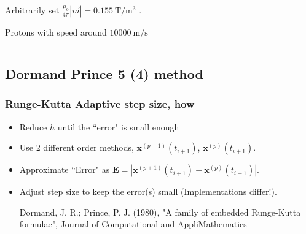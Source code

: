 \documentclass{beamer}
\begin{document}
\begin{frame}
\begin{columns}
\begin{column}{0.5\linewidth}
{{\color{gray}  Arbitrarily set $\frac{\mu_0}{4\pi}|\vec{m}|= \SI{0.155}{\tesla\per\cubic\meter}$ .

 Protons with speed around $\SI{10000}{\meter\per\second}$}


}%
\end{column}
\end{columns}
\end{frame}


\subsection{Dormand Prince 5 (4) method}

\begin{frame}
\frametitle{Runge-Kutta Adaptive step size, how}
\begin{itemize}
\item <1-> Reduce $h$ until the ``error" is small enough

\item <2-> Use 2 different order methods, $\mathbf{x}^{(p+1)}(t_{i+1})$, $\mathbf{x}^{(p)}(t_{i+1})$.

\item <3-> Approximate ``Error" as  $\mathbf{E} = |\mathbf{x}^{(p+1)}(t_{i+1})-\mathbf{x}^{(p)}(t_{i+1})|$.

\item <4-> Adjust step size to keep the error(s) small (Implementations differ!).

{\color{gray} Dormand, J. R.; Prince, P. J. (1980), "A family of embedded Runge-Kutta formulae", Journal of Computational and AppliMathematics}
\begin{equation}
\end{equation}


\end{itemize}
\end{frame}
\end{document}
